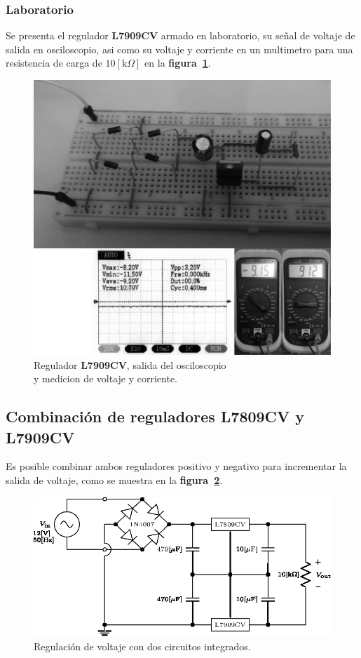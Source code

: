 \subsubsection{Laboratorio}
Se presenta el regulador \textbf{L7909CV} armado en laboratorio, su señal de
voltaje de salida en osciloscopio, asi como su voltaje y corriente en un
multimetro para una resistencia de carga de $10[\text{k}\Omega]$ en la
\textbf{figura~\ref{laboratorio12}}.

\begin{figure}[!h]
\centering
\includegraphics[scale=0.28]{fotos/10.regulador2.eps}
\caption{Regulador \textbf{L7909CV}, salida del osciloscopio\\
y medicion de voltaje y corriente.}
\label{laboratorio12}
\end{figure}

\subsection{Combinación de reguladores L7809CV y L7909CV}
Es posible combinar ambos reguladores positivo y negativo para incrementar la
salida de voltaje, como se muestra en la \textbf{figura~\ref{circuito11}}.

\begin{figure}[!h]
\centering
\includegraphics[scale=1.20]{diagramas/11.regulador3.eps}
\caption{Regulación de voltaje con dos circuitos integrados.}
\label{circuito11}
\end{figure}

